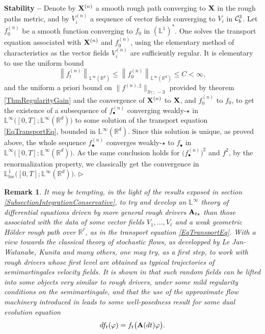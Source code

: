 \documentclass[11pt,a4paper]{amsart}
\newcommand{\RR}{\mathbb{R}}  \newcommand{\CC}{\mathbb{C}}  \newcommand{\LL}{\mathbb{L}}  \newcommand{\WW}{\mathbb{W}}
\renewcommand{\leq}{\leqslant}
\newtheorem{rem}[thm]{{\sc Remark}}
\numberwithin{equation}{section} %
\newenvironment{Dem}{%
    \begin{list}{\hspace{0.5cm}{\sc Proof --}}{%
        \setlength{\topsep}{0pt}%
        \setlength{\leftmargin}{0pt}%
        \setlength{\rightmargin}{0pt}%
        \setlength{\listparindent}{0pt}%
        \setlength{\itemindent}{0pt}%
        \setlength{\parsep}{0pt}%
        \addtolength{\leftmargin}{20pt}%
        \addtolength{\rightmargin}{0pt}%
    } \item }{\hfill{\space $\rhd$}\end{list}\smallskip}
\begin{document}
\begin{Dem}
{\bf Stability --} Denote by ${{\bf X}}^{(n)}$ a smooth rough path converging to ${\bf X}$ in the rough paths metric, and by $V^{(n)}_i$ a sequence of vector fields converging to $V_i$ in $\mathcal{C}^3_b$. Let $f^{(n)}_0$ be a smooth function converging to $f_0$ in $(\LL^1)^*$. One solves the transport equation associated with ${{\bf X}}^{(n)}$ and $f^{(n)}_0$, using the elementary method of characteristics as the vector fields $V^{(n)}_i$ are sufficiently regular. It is elementary to use the uniform bound
$$
\left\|f^{(n)}_t\right\|_{\LL^\infty(\RR^d)} \leq \left\|f^{(n)}_0\right\|_{\LL^\infty(\RR^d)} \leq C<\infty,
$$ 
and the uniform a priori bound on $\big\|f^{(n),\sharp}\big\|_{3\gamma\,;\,-3}$ provided by theorem \ref{ThmRegularityGain} and the convergence of ${{\bf X}}^{(n)}$ to ${\bf X}$, and $f^{(n)}_0$ to $f_0$, to get the existence of a subsequence of $f^{(n)}_\bullet$ converging weakly-$\star$ in $\LL^\infty\big([0,T];\LL^\infty(\RR^d)\big)$ to some solution of the transport equation \eqref{EqTransportEq}, bounded in $\LL^\infty(\RR^d)$. Since this solution is unique, as proved above, the whole sequence $f^{(n)}_\bullet$ converges weakly-$\star$ to $f_\bullet$ in $\LL^\infty\big([0,T];\LL^\infty(\RR^d)\big)$. As the same conclusion holds for $\Big(f^{(n)}_\bullet\Big)^2$ and $f^2$, by the renormalization property, we classically get the convergence in $\LL^1_\textrm{loc}\big([0,T];\LL^\infty(\RR^d)\big)$.
\end{Dem}

\bigskip

\begin{rem}
It may be tempting, in the light of the results exposed in section \ref{SubsectionIntegrationConservative}, to try and develop an $\LL^\infty$ theory of differential equations driven by more general rough drivers ${\bf A}_{ts}$ than those associated with the data of some vector fields $V_1,\dots, V_\ell$ and a weak geometric H\"older rough path over $\RR^\ell$, as in the transport equation \eqref{EqTransportEq}. With a view towards the classical theory of stochastic flows, as developped by Le Jan-Watanabe, Kunita and many others, one may try, as a first step, to work with rough drivers whose first level are obtained as typical trajectories of semimartingales velocity fields. It is shown in \cite{BailleulRiedel} that such random fields can be lifted into some objects very similar to rough drivers, under some mild regularity conditions on the semimartingale, and that the use of the approximate flow machinery introduced in \cite{BailleulRMI} leads to some well-posedness result for some dual evolution equation 
$$
df_t(\varphi) = f_t\big({\bf A}(dt)\varphi\big) .   
$$ 
\end{rem}
\end{document}
